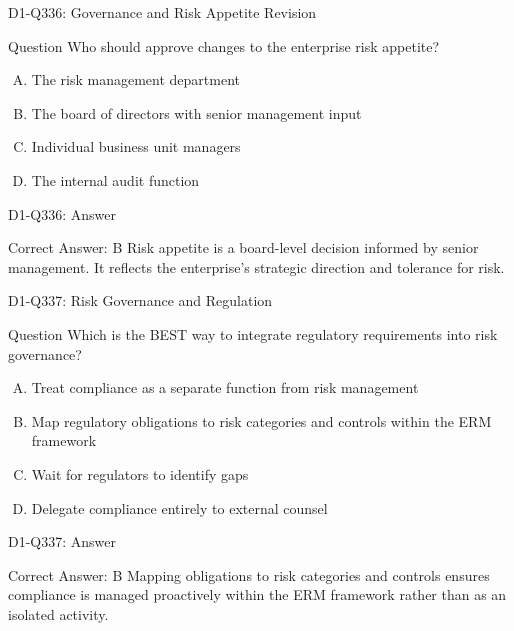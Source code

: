 \documentclass{beamer}
\begin{document}
\begin{frame}{D1-Q336: Governance and Risk Appetite Revision}
	\begin{block}{Question}
		Who should approve changes to the enterprise risk appetite?
	\end{block}
	\begin{enumerate}[(A)]
		\item The risk management department
		\item The board of directors with senior management input
		\item Individual business unit managers
		\item The internal audit function
	\end{enumerate}
\end{frame}
\begin{frame}{D1-Q336: Answer}
	\begin{block}{Correct Answer: B}
		Risk appetite is a board-level decision informed by senior management. It reflects the enterprise's strategic direction and tolerance for risk.
	\end{block}
\end{frame}

\begin{frame}{D1-Q337: Risk Governance and Regulation}
	\begin{block}{Question}
		Which is the BEST way to integrate regulatory requirements into risk governance?
	\end{block}
	\begin{enumerate}[(A)]
		\item Treat compliance as a separate function from risk management
		\item Map regulatory obligations to risk categories and controls within the ERM framework
		\item Wait for regulators to identify gaps
		\item Delegate compliance entirely to external counsel
	\end{enumerate}
\end{frame}
\begin{frame}{D1-Q337: Answer}
	\begin{block}{Correct Answer: B}
		Mapping obligations to risk categories and controls ensures compliance is managed proactively within the ERM framework rather than as an isolated activity.
	\end{block}
\end{frame}
\end{document}
